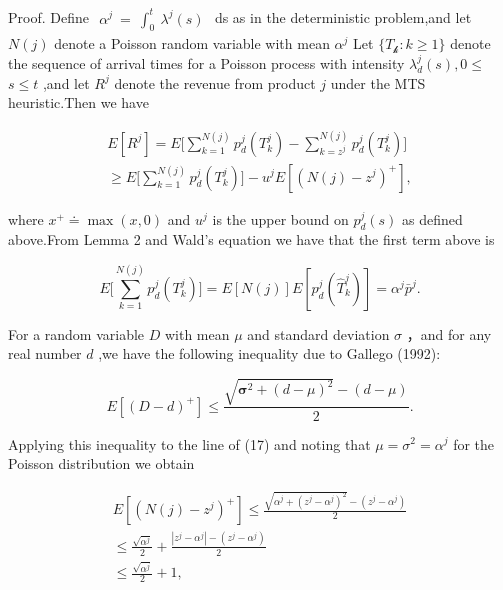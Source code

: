Proof. Define
\(\begin{array} { r } { \alpha ^ { j } ~ = ~ \int _ { 0 } ^ { t } ~ \lambda ^ { j } ( s ) } \end{array}\)
ds as in the deterministic problem,and let \(N ( j )\) denote a Poisson
random variable with mean \(\alpha ^ { j }\) Let
\(\{ T _ { \mathcal { k } } \colon k \geqslant 1 \}\) denote the
sequence of arrival times for a Poisson process with intensity
\(\lambda _ { d } ^ { j } ( s ) , 0 \leqslant\) \(s \leqslant t\) ,and
let \(R ^ { j }\) denote the revenue from product \(j\) under the MTS
heuristic.Then we have

\[
\begin{array} { l } { { \displaystyle E [ R ^ { j } ] = E \biggl [ \sum _ { k = 1 } ^ { N ( j ) } p _ { d } ^ { j } ( T _ { k } ^ { j } ) - \sum _ { k = z ^ { j } } ^ { N ( j ) } p _ { d } ^ { j } ( T _ { k } ^ { j } ) \biggr ] } } \\ { { \displaystyle \geqslant E \biggl [ \sum _ { k = 1 } ^ { N ( j ) } p _ { d } ^ { j } ( T _ { k } ^ { j } ) \biggr ] - u ^ { j } E [ ( N ( j ) - z ^ { j } ) ^ { + } ] , } } \end{array}
\]

where \(x ^ { + } \doteq \operatorname* { m a x } ( x , 0 )\) and
\(u ^ { j }\) is the upper bound on \(p _ { d } ^ { j } ( s )\) as
defined above.From Lemma 2 and Wald's equation we have that the first
term above is

\[
E \Big [ \sum _ { k = 1 } ^ { N ( j ) } p _ { d } ^ { j } ( T _ { k } ^ { j } ) \Big ] = E [ N ( j ) ] E [ p _ { d } ^ { j } ( \hat { T } _ { k } ^ { j } ) ] = \alpha ^ { j } \bar { p } ^ { j } .
\]

For a random variable \(D\) with mean \(\mu\) and standard deviation
\(\sigma\) ，and for any real number \(d\) ,we have the following
inequality due to Gallego (1992):

\[
E [ ( D - d ) ^ { + } ] \leqslant \frac { \sqrt { \pmb { \sigma } ^ { 2 } + ( d - \mu ) ^ { 2 } } - ( d - \mu ) } { 2 } .
\]

Applying this inequality to the line of (17) and noting that
\(\mu = \sigma ^ { 2 } = \alpha ^ { j }\) for the Poisson distribution
we obtain

\[
\begin{array} { c } { { E [ ( N ( j ) - z ^ { j } ) ^ { + } ] \leqslant \displaystyle \frac { \sqrt { \alpha ^ { j } + ( z ^ { j } - \alpha ^ { j } ) ^ { 2 } } - ( z ^ { j } - \alpha ^ { j } ) } { 2 } } } \\ { { \displaystyle \leqslant \displaystyle \frac { \sqrt { \alpha ^ { j } } } { 2 } + \frac { | z ^ { j } - \alpha ^ { j } | - ( z ^ { j } - \alpha ^ { j } ) } { 2 } } } \\ { { \displaystyle \leqslant \displaystyle \frac { \sqrt { \alpha ^ { j } } } { 2 } + 1 , } } \end{array}
\]

